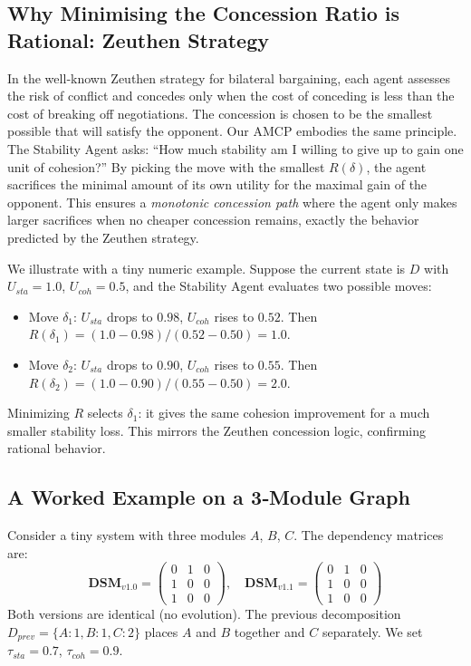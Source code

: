 \documentclass[conference]{IEEEtran}
\begin{document}
\subsection{Why Minimising the Concession Ratio is Rational: Zeuthen Strategy}
In the well‑known Zeuthen strategy for bilateral bargaining, each agent assesses the risk of conflict and concedes only when the cost of conceding is less than the cost of breaking off negotiations. The concession is chosen to be the smallest possible that will satisfy the opponent. Our AMCP embodies the same principle. The Stability Agent asks: ``How much stability am I willing to give up to gain one unit of cohesion?'' By picking the move with the smallest $R(\delta)$, the agent sacrifices the minimal amount of its own utility for the maximal gain of the opponent. This ensures a \emph{monotonic concession path} where the agent only makes larger sacrifices when no cheaper concession remains, exactly the behavior predicted by the Zeuthen strategy.

We illustrate with a tiny numeric example. 
Suppose the current state is $D$ with $U_{sta}=1.0$, $U_{coh}=0.5$, and the Stability Agent evaluates two possible moves:
\begin{itemize}
\item Move $\delta_1$: $U_{sta}$ drops to $0.98$, $U_{coh}$ rises to $0.52$. Then $R(\delta_1) = (1.0-0.98)/(0.52-0.50)=1.0$.
\item Move $\delta_2$: $U_{sta}$ drops to $0.90$, $U_{coh}$ rises to $0.55$. Then $R(\delta_2) = (1.0-0.90)/(0.55-0.50)=2.0$.
\end{itemize}
Minimizing $R$ selects $\delta_1$: it gives the same cohesion improvement for a much smaller stability loss. This mirrors the Zeuthen concession logic, confirming rational behavior.

\subsection{A Worked Example on a 3‑Module Graph}
Consider a tiny system with three modules $A$, $B$, $C$. 
The dependency matrices are:
\[
\mathbf{DSM}_{v1.0} = \begin{pmatrix} 0 & 1 & 0 \\ 1 & 0 & 0 \\ 1 & 0 & 0 \end{pmatrix}, \quad
\mathbf{DSM}_{v1.1} = \begin{pmatrix} 0 & 1 & 0 \\ 1 & 0 & 0 \\ 1 & 0 & 0 \end{pmatrix}
\]
Both versions are identical (no evolution). The previous decomposition $D_{prev} = \{A:1, B:1, C:2\}$ places $A$ and $B$ together and $C$ separately. We set $\tau_{sta}=0.7$, $\tau_{coh}=0.9$.
\end{document}
